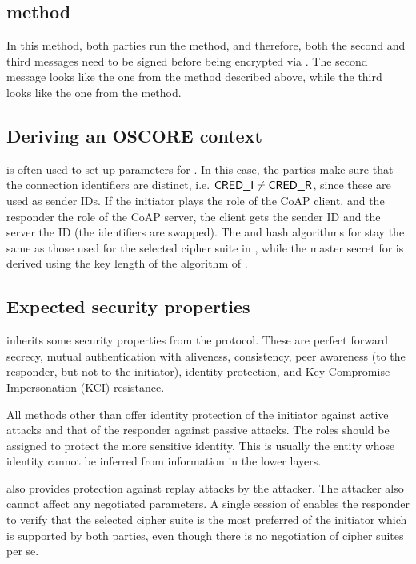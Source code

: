 \subsection{\mSigSig method}
In this method, both parties run the \mSig method, and therefore, both the second and third messages need to be signed before being encrypted via \mAead. The second message looks like the one from the \mSigStat method described above, while the third looks like the one from the \mStatSig method.



\subsection{Deriving an OSCORE context}
\mEdhoc is often used to set up parameters for \mOscore. In this case, the parties make sure that the connection identifiers are distinct, i.e. $\text{\textup{\textsf{CRED\_I}}} \neq \text{\textup{\textsf{CRED\_R}}}$, since these are used as \mOscore sender IDs. If the initiator plays the role of the CoAP client, and the responder the role of the CoAP server, the client gets the sender ID \mCredr and the server the ID \mCredi (the identifiers are swapped). The \mAead and hash algorithms for \mOscore stay the same as those used for the selected cipher suite in \mEdhoc, while the master secret for \mOscore is derived using the key length of the \mAead algorithm of \mEdhoc. 

\subsection{Expected security properties}
\mEdhoc inherits some security properties from the \mSigmaI protocol. These are perfect forward secrecy, mutual authentication with aliveness, consistency, peer awareness (to the responder, but not to the initiator), identity protection, and Key Compromise Impersonation (KCI) resistance.

All methods other than \mPskPsk offer identity protection of the initiator against active attacks and that of the responder against passive attacks. The roles should be assigned to protect the more sensitive identity. This is usually the entity whose identity cannot be inferred from information in the lower layers.

\mEdhoc also provides protection against replay attacks by the attacker. The attacker also cannot affect any negotiated parameters. A single session of \mEdhoc enables the responder to verify that the selected cipher suite is the most preferred of the initiator which is supported by both parties, even though there is no negotiation of cipher suites per se.

